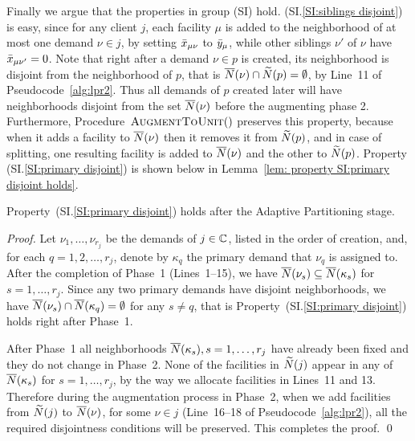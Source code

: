 \documentclass{llncs}
\begin{document}
Finally we argue that the properties in group (SI)
hold. (SI.\ref{SI:siblings disjoint}) is easy, since for any client
$j$, each facility $\mu$ is added to the neighborhood of at most one
demand $\nu\in j$, by setting ${\bar x}_{\mu\nu}$ to ${\bar y}_\mu$, while
other siblings $\nu'$ of $\nu$ have ${\bar x}_{\mu\nu'}=0$. Note that
right after a demand $\nu\in p$ is created, its neighborhood is
disjoint from the neighborhood of $p$, that is ${\overline{N}}(\nu)\cap
{\widetilde N}(p) = \emptyset$, by Line~11 of
Pseudocode~\ref{alg:lpr2}. Thus all demands of $p$ created later will
have neighborhoods disjoint from the set ${\overline{N}}(\nu)$ before the
augmenting phase 2. Furthermore, Procedure~${\textsc{AugmentToUnit}}()$
preserves this property, because when it adds a facility to
${\overline{N}}(\nu)$ then it removes it from ${\widetilde N}(p)$, and in case of
splitting, one resulting facility is added to ${\overline{N}}(\nu)$ and the
other to ${\widetilde N}(p)$. Property (SI.\ref{SI:primary disjoint}) is
shown below in Lemma~\ref{lem: property SI:primary disjoint holds}.


\begin{lemma}\label{lem: property SI:primary disjoint holds}
  Property~(SI.\ref{SI:primary disjoint}) holds after the
  Adaptive Partitioning stage.
\end{lemma}

\begin{proof}
  Let $\nu_1,\ldots,\nu_{r_j}$ be the demands of 
  $j\in\mathbb{C}$, listed in the order of creation, and, for each
  $q=1,2,\ldots,r_j$, denote by $\kappa_q$ the primary demand that
  $\nu_q$ is assigned to. After the completion of Phase~1
   (Lines~1--15), we have
  ${\overline{N}}(\nu_s)\subseteq {\overline{N}}(\kappa_s)$ for  $s=1,\ldots,r_j$. 
Since any two primary demands have disjoint
  neighborhoods, we have ${\overline{N}}(\nu_s) \cap {\overline{N}}(\kappa_q) =
  \emptyset$ for any $s\neq q$, that is
	Property~(SI.\ref{SI:primary disjoint}) holds right after Phase~1.

        After Phase~1 all neighborhoods ${\overline{N}}(\kappa_s),
        s=1,\ldots,r_j$ have already been fixed and they do not change
        in Phase~2.  None of the facilities in ${\widetilde N}(j)$ appear in
        any of ${\overline{N}}(\kappa_s)$ for $s=1,\ldots,r_j$, by the way we
        allocate facilities in Lines~11 and 13.  Therefore during the
        augmentation process in Phase~2, when we add facilities from
        ${\widetilde N}(j)$ to ${\overline{N}}(\nu)$, for some $\nu\in j$
        (Line~16--18 of Pseudocode~\ref{alg:lpr2}), all the required
        disjointness conditions will be preserved. This completes the proof.
\qed
\end{proof}
\end{document}
